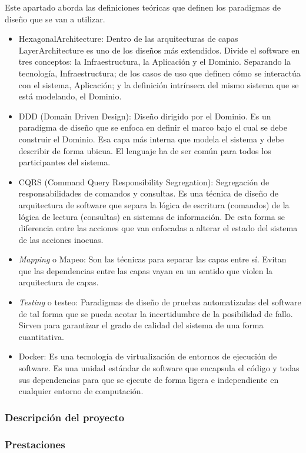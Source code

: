 Este apartado aborda las definiciones teóricas que definen los paradigmas de diseño que se van a utilizar.

\begin{itemize}
    \item \gls{HexagonalArchitecture}: Dentro de las arquitecturas de capas \gls{LayerArchitecture} es uno de los diseños más extendidos.
    Divide el software en tres conceptos: la Infraestructura, la Aplicación y el Dominio.
    Separando la tecnología, Infraestructura;
    de los casos de uso que definen cómo se interactúa con el sistema, Aplicación;
    y la definición intrínseca del mismo sistema que se está modelando, el Dominio.
    \item \gls{DDD} (Domain Driven Design): Diseño dirigido por el Dominio.
    Es un paradigma de diseño que se enfoca en definir el marco bajo el cual se debe construir el Dominio.
    Esa capa más interna que modela el sistema y debe describir de forma ubicua.
    El lenguaje ha de ser común para todos los participantes del sistema.
    \item \gls{CQRS} (Command Query Responsibility Segregation): Segregación de responsabilidades de comandos y consultas.
    Es una técnica de diseño de arquitectura de software que separa la lógica de escritura (comandos) de la lógica de lectura (consultas) en sistemas de información.
    De esta forma se diferencia entre las acciones que van enfocadas a alterar el estado del sistema de las acciones inocuas.
    \item \textit{Mapping} o Mapeo:
    Son las técnicas para separar las capas entre sí.
    Evitan que las dependencias entre las capas vayan en un sentido que violen la arquitectura de capas.
    \item \textit{Testing} o testeo:
    Paradigmas de diseño de pruebas automatizadas del software de tal forma que se pueda acotar la incertidumbre de la posibilidad de fallo.
    Sirven para garantizar el grado de calidad del sistema de una forma cuantitativa.
    \item Docker:
    Es una tecnología de virtualización de entornos de ejecución de software.
    Es una unidad estándar de software que encapsula el código y todas sus dependencias para que se ejecute de forma ligera e independiente en cualquier entorno de computación.
\end{itemize}



\subsubsection{Descripción del proyecto}


\subsubsection{Prestaciones}

